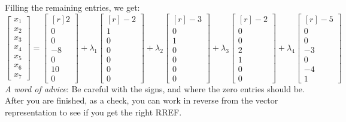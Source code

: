 \documentclass[12pt]{article}
\begin{document}
\begin{enumerate}
\[\]
Filling the remaining entries, we get:
\[
\begin{bmatrix}x_1\\x_2\\x_3\\x_4\\x_5\\x_6\\x_7\end{bmatrix}
=
\begin{bmatrix*}[r]            2 \\ 0\\ 0\\ -8\\ 0\\ 10\\ 0\end{bmatrix*}
+\lambda_1\begin{bmatrix*}[r] -2 \\ 1\\ 0\\  0\\ 0\\  0\\ 0\end{bmatrix*}
+\lambda_2\begin{bmatrix*}[r] -3 \\ 0\\ 1\\  0\\ 0\\  0\\ 0\end{bmatrix*}
+\lambda_3\begin{bmatrix*}[r] -2 \\ 0\\ 0\\  2\\ 1\\  0\\ 0\end{bmatrix*}
+\lambda_4\begin{bmatrix*}[r] -5 \\ 0\\ 0\\ -3\\ 0\\ -4\\ 1\end{bmatrix*}
\]
\emph{A word of advice}: Be careful with the signs, and where the zero entries should be. After you are finished, as a check, you can work in reverse from the vector representation to see if you get the right RREF.


\end{enumerate}
\end{document}
